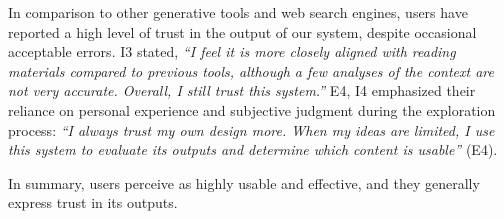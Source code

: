In comparison to other generative tools and web search engines, users have reported a high level of trust in the output of our system, despite occasional acceptable errors. I3 stated, \textit{``I feel it is more closely aligned with reading materials compared to previous tools, although a few analyses of the context are not very accurate. Overall, I still trust this system.''} E4, I4 emphasized their reliance on personal experience and subjective judgment during the exploration process: \textit{``I always trust my own design more. When my ideas are limited, I use this system to evaluate its outputs and determine which content is usable''} (E4).

In summary, users perceive \name{} as highly usable and effective, and they generally express trust in its outputs.